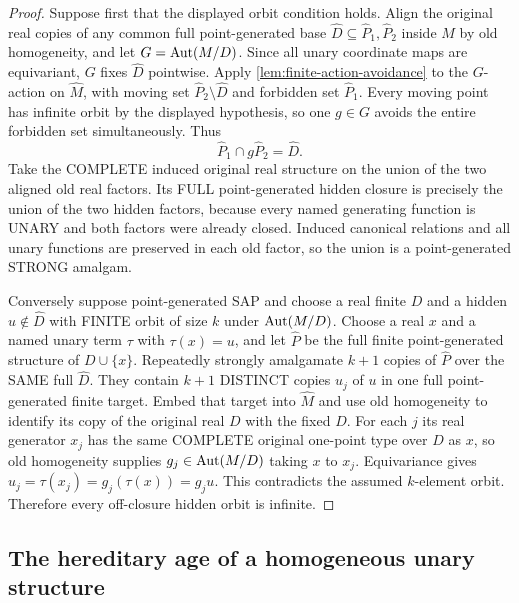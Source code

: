 \begin{proof}
Suppose first that the displayed orbit condition holds.  Align
the original real copies of any common full point-generated
base $\widehat D\subseteq\widehat P_1,\widehat P_2$
inside $M$ by old homogeneity, and let
$G=\operatorname{Aut}(M/D)$.  Since all unary coordinate maps are
equivariant, $G$ fixes $\widehat D$ pointwise.
Apply \cref{lem:finite-action-avoidance} to the $G$-action on
$\widehat M$, with moving set
$\widehat P_2\setminus\widehat D$ and forbidden set $\widehat P_1$.
Every moving point has infinite orbit by the displayed hypothesis,
so one $g\in G$ avoids the entire forbidden set simultaneously.
Thus
\[
        \widehat P_1\cap g\widehat P_2=\widehat D.
\]
Take the COMPLETE induced original real structure on the
union of the two aligned old real factors.  Its FULL
point-generated hidden closure is precisely the union
of the two hidden factors, because every named generating
function is UNARY and both factors were already closed.
Induced canonical relations and all unary functions are
preserved in each old factor, so the union is a
point-generated STRONG amalgam.

Conversely suppose point-generated SAP and choose a real
finite $D$ and a hidden $u\notin\widehat D$ with
FINITE orbit of size $k$ under $\operatorname{Aut}(M/D)$.
Choose a real $x$ and a named unary term $\tau$
with $\tau(x)=u$, and let $\widehat P$ be the full
finite point-generated structure of $D\cup\{x\}$.
Repeatedly strongly amalgamate $k+1$ copies of
$\widehat P$ over the SAME full $\widehat D$.
They contain $k+1$ DISTINCT copies $u_j$ of
$u$ in one full point-generated finite target.
Embed that target into $\widehat M$ and use
old homogeneity to identify its copy of the
original real $D$ with the fixed $D$.
For each $j$ its real generator $x_j$ has the
same COMPLETE original one-point type over $D$
as $x$, so old homogeneity supplies
$g_j\in\operatorname{Aut}(M/D)$ taking $x$ to $x_j$.
Equivariance gives
$u_j=\tau(x_j)=g_j(\tau(x))=g_ju$.
This contradicts the assumed $k$-element orbit.
Therefore every off-closure hidden orbit is infinite.
\end{proof}

\subsection{The hereditary age of a homogeneous unary structure}

